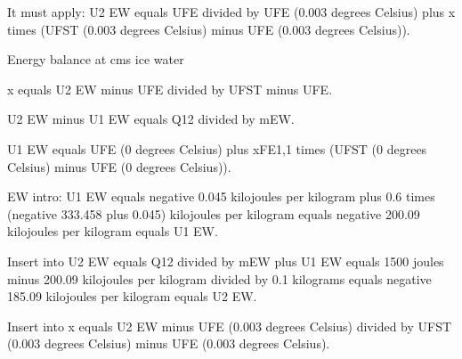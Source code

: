 It must apply: U2 EW equals UFE divided by UFE (0.003 degrees Celsius) plus x times (UFST (0.003 degrees Celsius) minus UFE (0.003 degrees Celsius)).

Energy balance at cms ice water

x equals U2 EW minus UFE divided by UFST minus UFE.

U2 EW minus U1 EW equals Q12 divided by mEW.

U1 EW equals UFE (0 degrees Celsius) plus xFE1,1 times (UFST (0 degrees Celsius) minus UFE (0 degrees Celsius)).

EW intro: U1 EW equals negative 0.045 kilojoules per kilogram plus 0.6 times (negative 333.458 plus 0.045) kilojoules per kilogram equals negative 200.09 kilojoules per kilogram equals U1 EW.

Insert into U2 EW equals Q12 divided by mEW plus U1 EW equals 1500 joules minus 200.09 kilojoules per kilogram divided by 0.1 kilograms equals negative 185.09 kilojoules per kilogram equals U2 EW.

Insert into x equals U2 EW minus UFE (0.003 degrees Celsius) divided by UFST (0.003 degrees Celsius) minus UFE (0.003 degrees Celsius).
